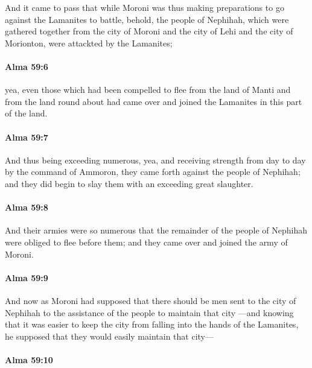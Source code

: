 			And it came to pass that while Moroni was thus making preparations
			to go against the Lamanites to battle,
			behold, the people of Nephihah, which were gathered together
			from the city of Moroni and the city of Lehi and the city of Morionton,
			were attackted by the Lamanites;

		\paragraph{Alma 59:6} %
			\label{ALMA-59-6}

			yea, even those which had been compelled to flee
			from the land of Manti and from the land round about
			had came over and joined the Lamanites in this part of the land.

		\paragraph{Alma 59:7} %
			\label{ALMA-59-7}

			And thus being exceeding numerous,
			yea, and receiving strength from day to day by the command of Ammoron,
			they came forth against the people of Nephihah;
			and they did begin to slay them with an exceeding great slaughter.

		\paragraph{Alma 59:8} %
			\label{ALMA-59-8}

			And their armies were so numerous
			that the remainder of the people of Nephihah were obliged to flee before them;
			and they came over and joined the army of Moroni.

		\paragraph{Alma 59:9} %
			\label{ALMA-59-9}

			And now as Moroni had supposed
			that there should be men sent to the city of Nephihah
			to the assistance of the people to maintain that city
			---and knowing that it was easier to keep the city
			from falling into the hands of the Lamanites,
			he supposed that they would easily maintain that city---

		\paragraph{Alma 59:10} %
			\label{ALMA-59-10}

